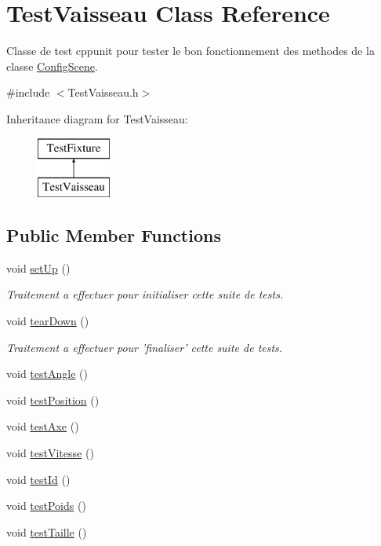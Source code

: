 \hypertarget{class_test_vaisseau}{\section{Test\-Vaisseau Class Reference}
\label{class_test_vaisseau}
}


Classe de test cppunit pour tester le bon fonctionnement des methodes de la classe \hyperlink{class_config_scene}{Config\-Scene}.  




{\ttfamily \#include $<$Test\-Vaisseau.\-h$>$}

Inheritance diagram for Test\-Vaisseau\-:\begin{figure}[H]
\begin{center}
\leavevmode
\includegraphics[height=2.000000cm]{class_test_vaisseau}
\end{center}
\end{figure}
\subsection*{Public Member Functions}
\begin{DoxyCompactItemize}
\item 
void \hyperlink{group__inf2990_ga852614152af5bbd1217eb9daeccb0853}{set\-Up} ()
\begin{DoxyCompactList}\small\item\em Traitement a effectuer pour initialiser cette suite de tests. \end{DoxyCompactList}\item 
void \hyperlink{group__inf2990_gadbbaf2e4b333b96d17c8c1ecdcb0094c}{tear\-Down} ()
\begin{DoxyCompactList}\small\item\em Traitement a effectuer pour 'finaliser' cette suite de tests. \end{DoxyCompactList}\item 
void \hyperlink{group__inf2990_gac69cdb3bd02f6e9619db1c98fe2ad74a}{test\-Angle} ()
\item 
void \hyperlink{group__inf2990_ga8dfd283eaafd040183f933e16c7cf9d3}{test\-Position} ()
\item 
void \hyperlink{group__inf2990_gac9bfdb07899b15e44c4f96c13eb0a14e}{test\-Axe} ()
\item 
void \hyperlink{group__inf2990_gac3309005ab38045a6b179cb23cf27876}{test\-Vitesse} ()
\item 
void \hyperlink{group__inf2990_gaaeafd8d31bdb30cb0d25b590905616a3}{test\-Id} ()
\item 
void \hyperlink{group__inf2990_gaddaf66dbd1eed412d12c88afc7cb31ca}{test\-Poids} ()
\item 
void \hyperlink{group__inf2990_ga3442abc51b435aa7f65702696fc11d81}{test\-Taille} ()
\end{DoxyCompactItemize}


